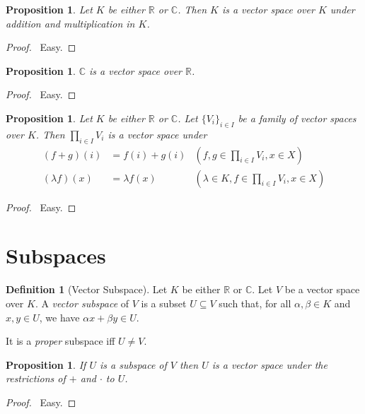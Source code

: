 \documentclass{book}
\let\qed\relax
\newtheorem{prop}[ax]{Proposition}
\theoremstyle{definition}
\newtheorem{df}[ax]{Definition}
\begin{document}
\begin{prop}
Let $K$ be either $\mathbb{R}$ or $\mathbb{C}$. Then $K$ is a vector space over $K$ under addition and multiplication in $K$.
\end{prop}

\begin{proof}
\pf\ Easy. \qed
\end{proof}

\begin{prop}
$\mathbb{C}$ is a vector space over $\mathbb{R}$.
\end{prop}

\begin{proof}
\pf\ Easy. \qed
\end{proof}

\begin{prop}
Let $K$ be either $\mathbb{R}$ or $\mathbb{C}$. Let $\{ V_i \}_{i \in I}$ be a family of vector spaces over $K$. Then $\prod_{i \in I} V_i$ is a vector space under
\begin{align*}
(f + g)(i) & = f(i) + g(i) & (f,g \in \prod_{i \in I} V_i, x \in X) \\
(\lambda f)(x) & = \lambda f(x) & (\lambda \in K, f \in \prod_{i \in I} V_i, x \in X)
\end{align*}
\end{prop}

\begin{proof}
\pf\ Easy. \qed
\end{proof}

\section{Subspaces}

\begin{df}[Vector Subspace]
Let $K$ be either $\mathbb{R}$ or $\mathbb{C}$. Let $V$ be a vector space over $K$. A \emph{vector subspace} of $V$ is a subset $U \subseteq V$ such that, for all $\alpha, \beta \in K$ and $x,y \in U$, we have $\alpha x + \beta y \in U$.

It is a \emph{proper} subspace iff $U \neq V$.
\end{df}

\begin{prop}
If $U$ is a subspace of $V$ then $U$ is a vector space under the restrictions of $+$ and $\cdot$ to $U$.
\end{prop}

\begin{proof}
\pf\ Easy. \qed
\end{proof}
\end{document}
